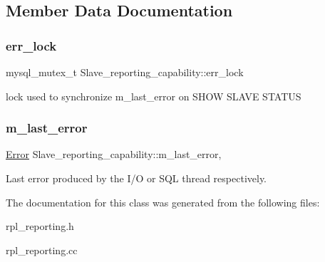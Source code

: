 \subsection{Member Data Documentation}
\mbox{\label{classSlave__reporting__capability_a6889000967fab001bcec9f1aad8e2966}} 
\subsubsection{\texorpdfstring{err\+\_\+lock}{err\_lock}}
{\footnotesize\ttfamily mysql\+\_\+mutex\+\_\+t Slave\+\_\+reporting\+\_\+capability\+::err\+\_\+lock\hspace{0.3cm}{\ttfamily [mutable]}}

lock used to synchronize m\+\_\+last\+\_\+error on \textquotesingle{}S\+H\+OW S\+L\+A\+VE S\+T\+A\+T\+US\textquotesingle{} \mbox{\label{classSlave__reporting__capability_ae98a14a03e2c638a21a5c1d83a547e86}} 
\subsubsection{\texorpdfstring{m\+\_\+last\+\_\+error}{m\_last\_error}}
{\footnotesize\ttfamily \mbox{\hyperlink{classSlave__reporting__capability_1_1Error}{Error}} Slave\+\_\+reporting\+\_\+capability\+::m\+\_\+last\+\_\+error\hspace{0.3cm}{\ttfamily [mutable]}, {\ttfamily [protected]}}

Last error produced by the I/O or S\+QL thread respectively. 

The documentation for this class was generated from the following files\+:\begin{DoxyCompactItemize}
\item 
rpl\+\_\+reporting.\+h\item 
rpl\+\_\+reporting.\+cc\end{DoxyCompactItemize}
